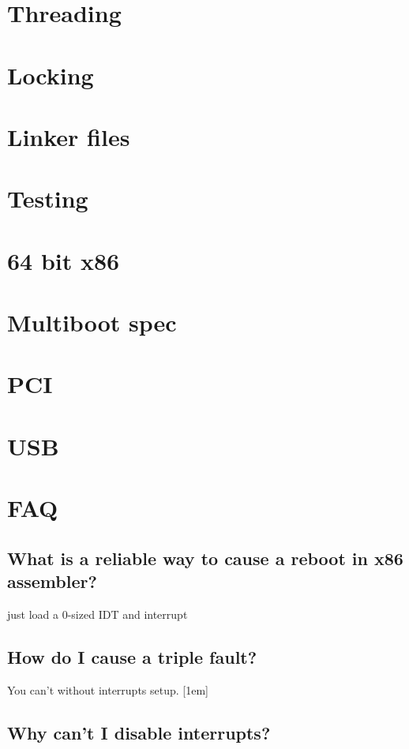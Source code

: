 \documentclass[oneside,english,final]{amsbook}
\begin{document}
\chapter{Threading}
\chapter{Locking}
\chapter{Linker files}
\chapter{Testing}
\chapter{64 bit x86}
\chapter{Multiboot spec}
\chapter{PCI}
\chapter{USB}


\chapter{FAQ}
\section{What is a reliable way to cause a reboot in x86 assembler?}

just load a 0-sized IDT and interrupt


\section{How do I cause a triple fault?}

You can't without interrupts setup.  [1em]

\section{Why can't I disable interrupts?}
\end{document}
